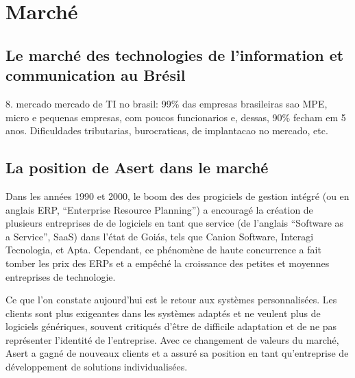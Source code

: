 \section{Marché}
\subsection{Le marché des technologies de l'information et communication au Brésil}


8. mercado
	mercado de TI no brasil: 99\% das empresas brasileiras sao MPE, micro e pequenas empresas, com poucos funcionarios e, dessas, 90\% fecham em 5 anos. Dificuldades tributarias, burocraticas, de implantacao no mercado, etc.


\subsection{La position de Asert dans le marché}

Dans les années 1990 et 2000, le boom des des progiciels de gestion intégré (ou en anglais ERP,  ``Enterprise Resource Planning'') a encouragé la création de plusieurs entreprises de de logiciels en tant que service (de l'anglais ``Software as a Service'', SaaS) dans l'état de Goiás, tels que Canion Software, Interagi Tecnologia, et Apta. Cependant, ce phénomène de haute concurrence a fait tomber les prix des ERPs et a empêché la croissance des petites et moyennes entreprises de technologie.

Ce que l'on constate aujourd'hui est le retour aux systèmes personnalisées. Les clients sont plus exigeantes dans les systèmes adaptés et ne veulent plus de logiciels génériques, souvent critiqués d'être de difficile adaptation et de ne pas représenter l'identité de l'entreprise. Avec ce changement de valeurs du marché, Asert a gagné de nouveaux clients et a assuré sa position en tant qu'entreprise de développement de solutions individualisées.



